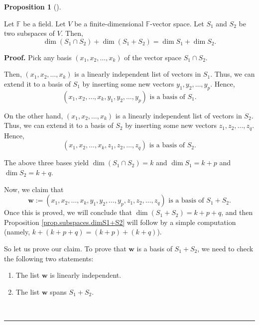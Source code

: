 \documentclass[numbers=enddot,12pt,final,onecolumn,notitlepage]{scrartcl}%
\numberwithin{exer}{subsection}
\theoremstyle{definition}
\newtheorem{prop}[theo]{Proposition}
\newenvironment{proposition}[1][]
{\begin{prop}[#1]\begin{leftbar}}
{\end{leftbar}\end{prop}}
\newenvironment{proof}[1][Proof]{\noindent\textbf{#1.} }{\ \rule{0.5em}{0.5em}}
\begin{document}
\begin{proposition}
\label{prop.subspaces.dimS1+S2}Let $\mathbb{F}$ be a field. Let $V$ be a
finite-dimensional $\mathbb{F}$-vector space. Let $S_{1}$ and $S_{2}$ be two
subspaces of $V$. Then,%
\[
\dim\left(  S_{1}\cap S_{2}\right)  +\dim\left(  S_{1}+S_{2}\right)  =\dim
S_{1}+\dim S_{2}.
\]

\end{proposition}

\begin{proof}
Pick any basis $\left(  x_{1},x_{2},\ldots,x_{k}\right)  $ of the vector space
$S_{1}\cap S_{2}$.

Then, $\left(  x_{1},x_{2},\ldots,x_{k}\right)  $ is a linearly independent
list of vectors in $S_{1}$. Thus, we can extend it to a basis of $S_{1}$ by
inserting some new vectors $y_{1},y_{2},\ldots,y_{p}$. Hence,%
\[
\left(  x_{1},x_{2},\ldots,x_{k},y_{1},y_{2},\ldots,y_{p}\right)  \text{ is a
basis of }S_{1}\text{.}%
\]


On the other hand, $\left(  x_{1},x_{2},\ldots,x_{k}\right)  $ is a linearly
independent list of vectors in $S_{2}$. Thus, we can extend it to a basis of
$S_{2}$ by inserting some new vectors $z_{1},z_{2},\ldots,z_{q}$. Hence,%
\[
\left(  x_{1},x_{2},\ldots,x_{k},z_{1},z_{2},\ldots,z_{q}\right)  \text{ is a
basis of }S_{2}\text{.}%
\]


The above three bases yield $\dim\left(  S_{1}\cap S_{2}\right)  =k$ and $\dim
S_{1}=k+p$ and $\dim S_{2}=k+q$.

Now, we claim that
\[
\mathbf{w}:=\left(  x_{1},x_{2},\ldots,x_{k},y_{1},y_{2},\ldots,y_{p}%
,z_{1},z_{2},\ldots,z_{q}\right)  \text{ is a basis of }S_{1}+S_{2}.
\]
Once this is proved, we will conclude that $\dim\left(  S_{1}+S_{2}\right)
=k+p+q$, and then Proposition \ref{prop.subspaces.dimS1+S2} will follow by a
simple computation (namely, $k+\left(  k+p+q\right)  =\left(  k+p\right)
+\left(  k+q\right)  $).

So let us prove our claim. To prove that $\mathbf{w}$ is a basis of
$S_{1}+S_{2}$, we need to check the following two statements:

\begin{enumerate}
\item The list $\mathbf{w}$ is linearly independent.

\item The list $\mathbf{w}$ spans $S_{1}+S_{2}$.
\end{enumerate}


\end{proof}
\end{document}
